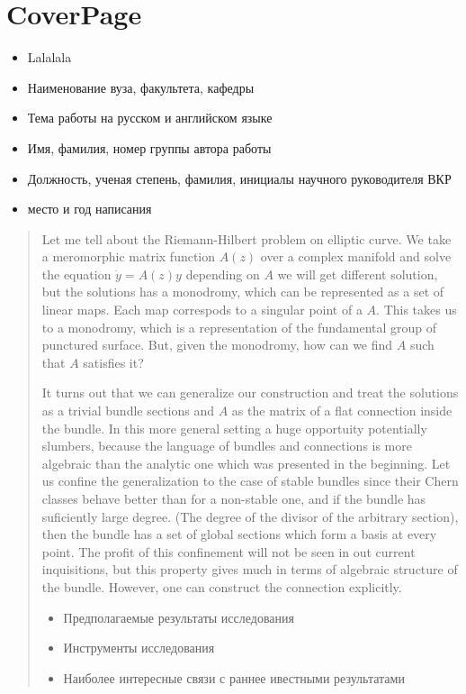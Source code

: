 \documentclass[11pt]{article}
\begin{document}
    \section*{CoverPage}
        \begin{itemize}
            \item Lalalala
            \item Наименование вуза, факультета, кафедры
            \item Тема работы на русском и английском языке
            \item Имя, фамилия, номер группы автора работы
            \item Должность, ученая степень, фамилия,
            инициалы научного руководителя ВКР
            \item место и год написания
        \end{itemize}

    \begin{abstract}
        Let me tell about the Riemann-Hilbert problem on elliptic curve.
        We take a meromorphic matrix function $A(z)$ over a
        complex manifold and solve the equation
        $\dot{y} = A(z)y$ depending on $A$ we will get different solution, but the
        solutions has a monodromy, which can be represented as a set of linear
        maps.
        Each map correspods to a singular point of a $A$.
        This takes us to a monodromy, which is a representation of
        the fundamental group of punctured surface.
        But, given the monodromy, how can we find $A$ such that $A$ satisfies it?

        It turns out that we can generalize our construction and treat the solutions
        as a trivial bundle sections and $A$ as the matrix of a flat connection inside the bundle.
        In this more general setting a huge opportuity potentially slumbers, because
        the language of bundles and connections is more algebraic than the analytic one
        which was presented in the beginning.
        Let us confine the generalization to the case of stable bundles since their Chern
        classes behave better than for a non-stable one, and
         if the bundle has suficiently large degree. (The degree of the divisor
        of the arbitrary section), then the bundle has a set of global sections
        which form a basis at every point.
        The profit of this confinement will not be seen in out current inquisitions, but this
        property gives much in terms of algebraic structure of the bundle.
        However, one can construct the connection explicitly.

        \begin{itemize}
            \item Предполагаемые результаты исследования
            \item Инструменты исследования
            \item Наиболее интересные связи с раннее ивестными результатами
        \end{itemize}


    \end{abstract}
\end{document}

